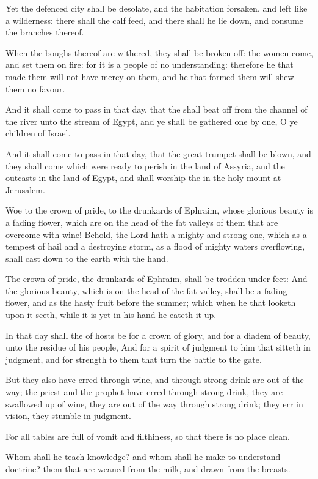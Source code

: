 \Verse Yet the defenced city shall be desolate, and the habitation forsaken, and left like a wilderness: there shall the calf feed, and there shall he lie down, and consume the branches thereof.

\Verse When the boughs thereof are withered, they shall be broken off: the women come, and set them on fire: for it is a people of no understanding: therefore he that made them will not have mercy on them, and he that formed them will shew them no favour.

\Verse And it shall come to pass in that day, that the \LORD shall beat off from the channel of the river unto the stream of Egypt, and ye shall be gathered one by one, O ye children of Israel.

\Verse And it shall come to pass in that day, that the great trumpet shall be blown, and they shall come which were ready to perish in the land of Assyria, and the outcasts in the land of Egypt, and shall worship the \LORD in the holy mount at Jerusalem.


\Chapter
\Verse Woe to the crown of pride, to the drunkards of Ephraim, whose glorious beauty is a fading flower, which are on the head of the fat valleys of them that are overcome with wine!  \Verse Behold, the Lord hath a mighty and strong one, which as a tempest of hail and a destroying storm, as a flood of mighty waters overflowing, shall cast down to the earth with the hand.

\Verse The crown of pride, the drunkards of Ephraim, shall be trodden under feet: \Verse And the glorious beauty, which is on the head of the fat valley, shall be a fading flower, and as the hasty fruit before the summer; which when he that looketh upon it seeth, while it is yet in his hand he eateth it up.

\Verse In that day shall the \LORD of hosts be for a crown of glory, and for a diadem of beauty, unto the residue of his people, \Verse And for a spirit of judgment to him that sitteth in judgment, and for strength to them that turn the battle to the gate.

\Verse But they also have erred through wine, and through strong drink are out of the way; the priest and the prophet have erred through strong drink, they are swallowed up of wine, they are out of the way through strong drink; they err in vision, they stumble in judgment.

\Verse For all tables are full of vomit and filthiness, so that there is no place clean.

\Verse Whom shall he teach knowledge? and whom shall he make to understand doctrine? them that are weaned from the milk, and drawn from the breasts.

